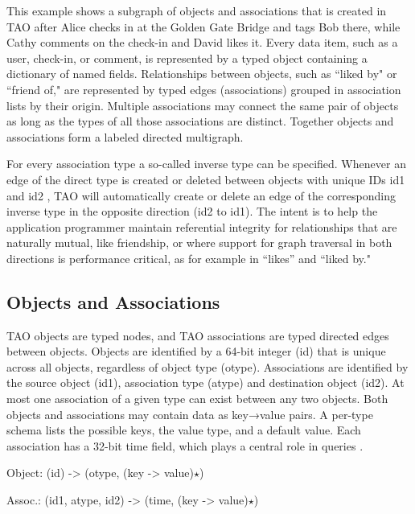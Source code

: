 \documentclass[9pt,twocolumn,twoside]{../../styles/osajnl}
\begin{document}
This example shows a subgraph of objects and associations that is created in TAO after Alice checks in at the Golden Gate Bridge and tags Bob there, while Cathy comments on the check-in and David likes it. Every data item, such as a user, check-in, or comment, is represented by a typed object containing a dictionary of named fields. Relationships between objects, such as “liked by" or “friend of," are represented by typed edges (associations) grouped in association lists by their origin. Multiple associations may connect the same pair of objects as long as the types of all those associations are distinct. Together objects and associations form a labeled directed multigraph.

For every association type a so-called inverse type can be specified. Whenever an edge of the direct type is created or deleted between objects with unique IDs id1 and id2 , TAO will automatically create or delete an edge of the corresponding inverse type in the opposite direction (id2 to id1). The intent is to help the application programmer maintain referential integrity for relationships that are naturally mutual, like friendship, or where support for graph traversal in both directions is performance critical, as for example in “likes” and “liked by."


\subsection{Objects and Associations}
TAO objects are typed nodes, and TAO associations are typed directed edges between objects. Objects are identified by a 64-bit integer (id) that is unique across all objects, regardless of object type (otype). Associations are identified by the source object (id1), association type (atype) and destination object (id2). At most one association of a given type can exist between any two objects. Both objects and associations may contain data as key→value pairs. A per-type schema lists the possible keys, the value type, and a default value. Each association has a 32-bit time field, which plays a central
role in queries \cite{book-tao1}.

Object: (id) -> (otype, (key -> value)$\star$)

Assoc.: (id1, atype, id2) -> (time, (key -> value)$\star$)
\end{document}
